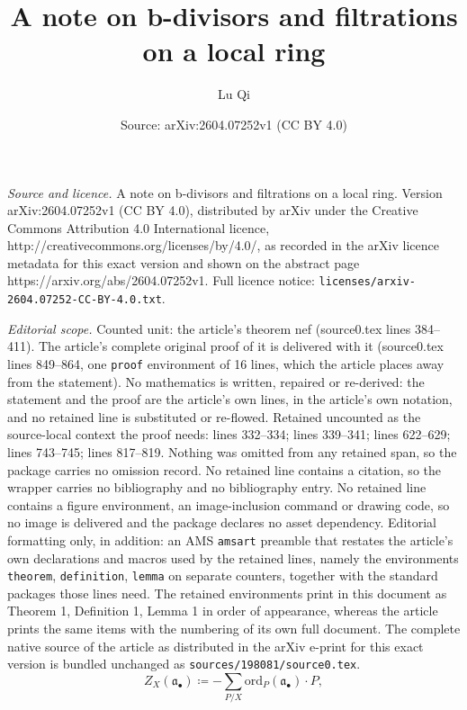 \documentclass[10pt,a4paper]{amsart}
\title{A note on b-divisors and filtrations on a local ring}
\author{Lu Qi}
\date{Source: arXiv:2604.07252v1 (CC BY 4.0)}
\newcommand{\fa}{\mathfrak{a}}
\newcommand{\ord}{\mathrm{ord}}
\begin{document}
\maketitle

\noindent\emph{Source and licence.} A note on b-divisors and filtrations on a local ring. Version arXiv:2604.07252v1 (CC BY 4.0), distributed by arXiv under the Creative Commons Attribution 4.0 International licence, http://creativecommons.org/licenses/by/4.0/, as recorded in the arXiv licence metadata for this exact version and shown on the abstract page https://arxiv.org/abs/2604.07252v1. Full licence notice: \texttt{licenses/arxiv-2604.07252-CC-BY-4.0.txt}.\par\smallskip

\noindent\textit{Editorial scope.} Counted unit: the article's theorem nef (source0.tex lines 384--411). The article's complete original proof of it is delivered with it (source0.tex lines 849--864, one \texttt{proof} environment of 16 lines, which the article places away from the statement). No mathematics is written, repaired or re-derived: the statement and the proof are the article's own lines, in the article's own notation, and no retained line is substituted or re-flowed.  Retained uncounted as the source-local context the proof needs: lines 332--334; lines 339--341; lines 622--629; lines 743--745; lines 817--819.  Nothing was omitted from any retained span, so the package carries no omission record.  No retained line contains a citation, so the wrapper carries no bibliography and no bibliography entry.  No retained line contains a figure environment, an image-inclusion command or drawing code, so no image is delivered and the package declares no asset dependency.  Editorial formatting only, in addition: an AMS \texttt{amsart} preamble that restates the article's own declarations and macros used by the retained lines, namely the environments \texttt{theorem}, \texttt{definition}, \texttt{lemma} on separate counters, together with the standard packages those lines need.  The retained environments print in this document as Theorem 1, Definition 1, Lemma 1 in order of appearance, whereas the article prints the same items with the numbering of its own full document.  The complete native source of the article as distributed in the arXiv e-print for this exact version is bundled unchanged as \texttt{sources/198081/source0.tex}.
\begin{equation}\label{eqn:filtr to b-div}
    Z_X(\fa_\bullet)\coloneqq -\sum_{P/X} \ord_P(\fa_\bullet)\cdot P,
\end{equation}
\end{document}

